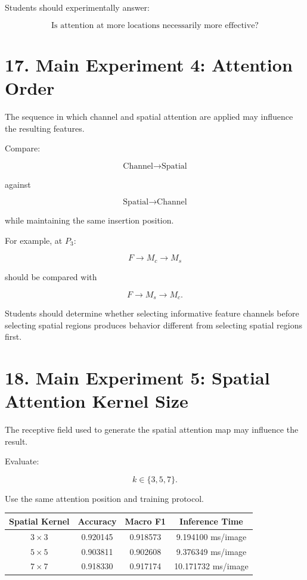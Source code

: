 \documentclass[10pt]{article}
\begin{document}
Students should experimentally answer:

\[
\boxed{
\text{Is attention at more locations necessarily more effective?}
}
\]

\section*{17. Main Experiment 4: Attention Order}

The sequence in which channel and spatial attention are applied may influence
the resulting features.

Compare:

\[
\boxed{
\text{Channel}
\rightarrow
\text{Spatial}
}
\]

against

\[
\boxed{
\text{Spatial}
\rightarrow
\text{Channel}
}
\]

while maintaining the same insertion position.

For example, at $P_3$:

\[
F
\rightarrow
M_c
\rightarrow
M_s
\]

should be compared with

\[
F
\rightarrow
M_s
\rightarrow
M_c.
\]

Students should determine whether selecting informative feature channels
before selecting spatial regions produces behavior different from selecting
spatial regions first.

\section*{18. Main Experiment 5: Spatial Attention Kernel Size}

The receptive field used to generate the spatial attention map may influence
the result.

Evaluate:

\[
k\in\{3,5,7\}.
\]

Use the same attention position and training protocol.

\begin{center}

\begin{tabular}{|c|c|c|c|}
\hline

\textbf{Spatial Kernel}
&
\textbf{Accuracy}
&
\textbf{Macro F1}
&
\textbf{Inference Time}
\\
\hline

$3\times3$
& 0.920145 
& 0.918573 
& 9.194100 ms/image
\\
\hline

$5\times5$
& 0.903811
& 0.902608
& 9.376349 ms/image
\\
\hline

$7\times7$
& 0.918330
& 0.917174
& 10.171732 ms/image
\\
\hline

\end{tabular}

\end{center}
\end{document}
